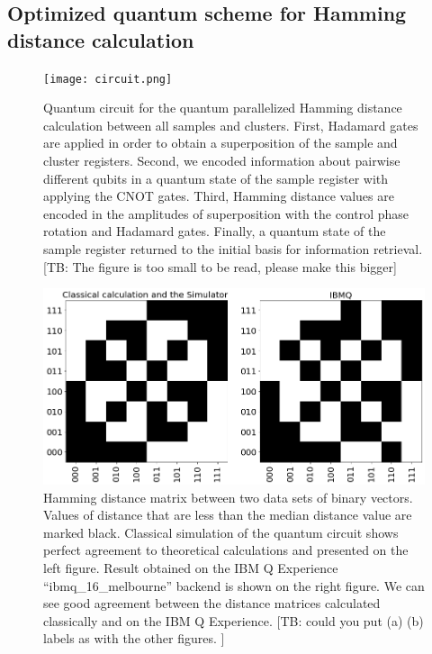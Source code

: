 \documentclass[pra,showkeys,twocolumn,showpacs]{revtex4-1}
\begin{document}
\subsection{Optimized quantum scheme for Hamming distance calculation}
\label{subsec:qcircuit}


\begin{figure}[t]
\texttt{[image: circuit.png]}
\caption{
    Quantum circuit for the quantum parallelized Hamming distance calculation between all samples and clusters. First,  Hadamard gates are applied in order to obtain a superposition of the sample and cluster registers. Second, we encoded information about pairwise different qubits in a quantum state of the sample register with applying the CNOT gates. Third, Hamming distance values are encoded in the amplitudes of superposition with the control phase rotation and Hadamard gates. Finally, a quantum state of the sample register returned to the initial basis for information retrieval. [TB: The figure is too small to be read, please make this bigger]
} 
\label{circuit}
\end{figure}



\begin{figure}[t]
\includegraphics[width=0.95\columnwidth]{distance_matrix.png}
\caption{Hamming distance matrix between two data sets of binary vectors. Values of distance that are less than the median distance value are marked black. Classical simulation of the quantum circuit shows perfect agreement to theoretical calculations and presented on the left figure. Result obtained on the IBM Q Experience ``ibmq\_16\_melbourne'' backend is shown on the right figure. We can see good agreement between the distance matrices calculated classically and on the IBM Q Experience.  [TB: could you put (a) (b) labels as with the other figures. ]} 
\label{fig:distance_matrix}
\end{figure}
\end{document}
